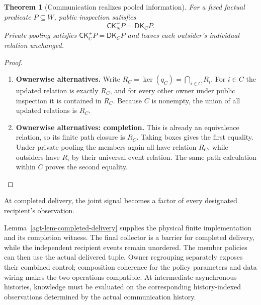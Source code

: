 \documentclass[11pt,a4paper]{article}
\numberwithin{equation}{section}
\newtheorem{theorem}{Theorem}[section]
\theoremstyle{definition}
\theoremstyle{remark}
\theoremstyle{plain}
\providecommand{\DK}{\mathsf{DK}}
\providecommand{\CK}{\mathsf{CK}}
\providecommand{\kerpair}{\mathop{\mathrm{ker}}}
\begin{document}
\begin{theorem}[Communication realizes pooled information]
\label{agt-thm-pooling}
For a fixed factual predicate $P\subseteq W$, public inspection satisfies
\[
 \CK_N^+P=\DK_CP.
\]
Private pooling satisfies $\CK_C^+P=\DK_CP$ and leaves each outsider's
individual relation unchanged.
\end{theorem}
\begin{proof}
\leavevmode
\begin{enumerate}[label=\textup{(\arabic*)},leftmargin=*,itemsep=4pt,topsep=3pt]
  \item \textbf{Ownerwise alternatives.} Write $R_C=\kerpair(q_C)=\bigcap_{i\in C}R_i$. For $i\in C$ the updated
relation is exactly $R_C$, and for every other owner under public inspection
it is contained in $R_C$. Because $C$ is nonempty, the union of all updated
relations is $R_C$.
  \item \textbf{Ownerwise alternatives: completion.} This is already an equivalence relation, so its finite
path closure is $R_C$. Taking boxes gives the first equality. Under private
pooling the members again all have relation $R_C$, while outsiders have
$R_i$ by their universal event relation. The same path calculation within
$C$ proves the second equality.
\end{enumerate}
\end{proof}

\noindent At completed delivery, the joint signal becomes a factor
of every designated recipient's observation.
\begin{center}
\end{center}

Lemma~\ref{agt-lem-completed-delivery} supplies the physical finite
implementation and its completion witness. The final collector is a
barrier for completed delivery, while the independent recipient events
remain unordered. The member policies can then use the actual delivered
tuple. Owner regrouping separately exposes their combined control;
composition coherence for the policy parameters and data wiring makes
the two operations compatible. At intermediate asynchronous histories,
knowledge must be evaluated on the corresponding history-indexed
observations determined by the actual communication history.
\end{document}
